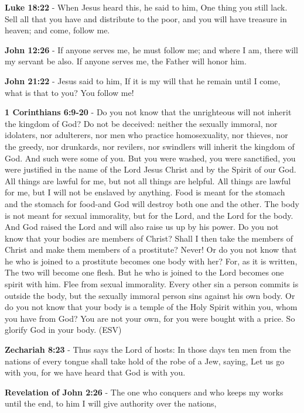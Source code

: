 \documentclass[11pt]{article}
\begin{document}
\textbf{Luke 18:22} - When Jesus heard this, he said to him, One thing you still lack. Sell all that you have and distribute to the poor, and you will have treasure in heaven; and come, follow me.

\textbf{John 12:26} - If anyone serves me, he must follow me; and where I am, there will my servant be also. If anyone serves me, the Father will honor him.

\textbf{John 21:22} - Jesus said to him, If it is my will that he remain until I come, what is that to you? You follow me!

\textbf{1 Corinthians 6:9-20} -  Do you not know that the unrighteous will not inherit the kingdom of God?  Do not be deceived: neither the sexually immoral, nor idolaters, nor adulterers, nor men who practice homosexuality, nor thieves, nor the greedy, nor drunkards, nor revilers, nor swindlers will inherit the kingdom of God.  And such were some of you.  But you were washed, you were sanctified, you were justified in the name of the Lord Jesus Christ and by the Spirit of our God.  All things are lawful for me, but not all things are helpful.  All things are lawful for me, but I will not be enslaved by anything.  Food is meant for the stomach and the stomach for food-and God will destroy both one and the other.  The body is not meant for sexual immorality, but for the Lord, and the Lord for the body.  And God raised the Lord and will also raise us up by his power.  Do you not know that your bodies are members of Christ?  Shall I then take the members of Christ and make them members of a prostitute?  Never! Or do you not know that he who is joined to a prostitute becomes one body with her?  For, as it is written, The two will become one flesh.  But he who is joined to the Lord becomes one spirit with him.  Flee from sexual immorality.  Every other sin a person commits is outside the body, but the sexually immoral person sins against his own body.  Or do you not know that your body is a temple of the Holy Spirit within you, whom you have from God?  You are not your own, for you were bought with a price.  So glorify God in your body.  (ESV)

\textbf{Zechariah 8:23} - Thus says the Lord of hosts: In those days ten men from the nations of every tongue shall take hold of the robe of a Jew, saying, Let us go with you, for we have heard that God is with you.

\textbf{Revelation of John 2:26} - The one who conquers and who keeps my works until the end, to him I will give authority over the nations,
\end{document}
